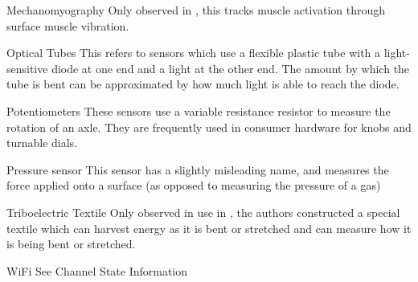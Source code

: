 \begin{Nomencl}[1cm]
    \item[Mechanomyography] Only observed in \cite{maHandGestureRecognition2017}, this tracks muscle activation through surface muscle vibration.
    \item[Optical Tubes] This refers to sensors which use a flexible plastic tube with a light-sensitive diode at one end and a light at the other end. The amount by which the tube is bent can be approximated by how much light is able to reach the diode.
    \item[Potentiometers] These sensors use a variable resistance resistor to measure the rotation of an axle. They are frequently used in consumer hardware for knobs and turnable dials.
    \item[Pressure sensor] This sensor has a slightly misleading name, and measures the force applied onto a surface (as opposed to measuring the pressure of a gas)
    \item[Triboelectric Textile] Only observed in use in \cite{wenMachineLearningGlove2020}, the authors constructed a special textile which can harvest energy as it is bent or stretched and can measure how it is being bent or stretched.
    \item[WiFi] See Channel State Information


\end{Nomencl}
